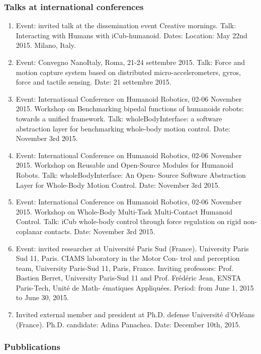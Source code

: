 \subsubsection{Talks at international conferences}

\begin{enumerate}
\item Event: invited talk at the dissemination event Creative mornings. Talk: Interacting with Humans with iCub-humanoid. Dates: Location: May 22nd 2015. Milano, Italy.
\item  Event: Convegno NanoItaly, Roma, 21-24 settembre 2015. Talk: Force and motion capture system
based on distributed micro-accelerometers, gyros, force and tactile sensing. Date: 21 settembre 2015.
\item  Event: International Conference on Humanoid Robotics, 02-06 November 2015. Workshop on Benchmarking bipedal functions of humanoids robots: towards a unified framework. Talk: wholeBodyInterface: a software abstraction layer for benchmarking whole-body motion control. Date: November 3rd 2015.
\item  Event: International Conference on Humanoid Robotics, 02-06 November 2015. Workshop on Reusable and Open-Source Modules for Humanoid Robots. Talk: wholeBodyInterface: An Open- Source Software Abstraction Layer for Whole-Body Motion Control. Date: November 3rd 2015.
\item  Event: International Conference on Humanoid Robotics, 02-06 November 2015. Workshop on Whole-Body Multi-Task Multi-Contact Humanoid Control. Talk: iCub whole-body control through force regulation on rigid non-coplanar contacts. Date: November 3rd 2015.
\item  Event: invited researcher at Université Paris Sud (France). University Paris Sud 11, Paris. CIAMS laboratory in the Motor Con- trol and perception team, University Paris-Sud 11, Paris, France. Inviting professors: Prof. Bastien Berret, University Paris-Sud 11 and Prof. Frédéric Jean, ENSTA Paris-Tech, Unité de Math- ématiques Appliquées. Period: from June 1, 2015 to June 30, 2015.
\item  Invited external member and president at Ph.D. defense Université d'Orléans (France). Ph.D. candidate: Adina Panachea. Date: December 10th, 2015.
\end{enumerate}


\subsubsection{Pubblications}


